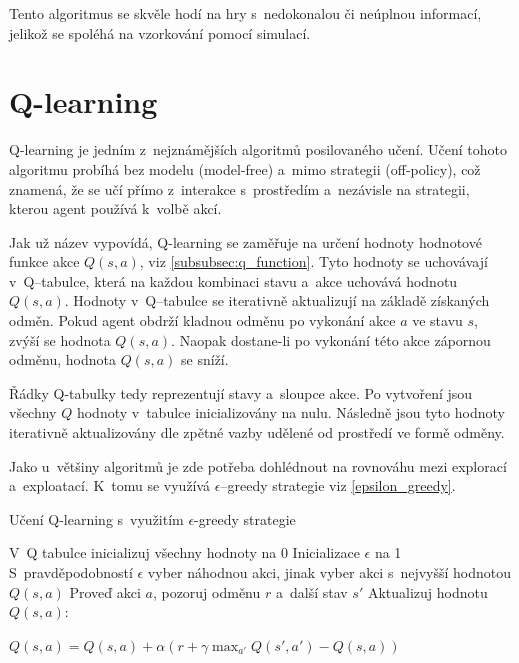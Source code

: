 Tento algoritmus se skvěle hodí na hry s~nedokonalou či neúplnou informací, jelikož se spoléhá na vzorkování pomocí simulací.

\section{Q-learning}\label{subsec:q-learning}

Q-learning je jedním z~nejznámějších algoritmů posilovaného učení.
Učení tohoto algoritmu probíhá bez modelu (model-free) a~mimo strategii (off-policy), což znamená, že se učí přímo z~interakce s~prostředím a~nezávisle na strategii, kterou agent používá k~volbě akcí.

Jak už název vypovídá, Q-learning se zaměřuje na určení hodnoty hodnotové funkce akce $Q(s, a)$, viz \ref{subsubsec:q_function}.
Tyto hodnoty se uchovávají v~Q--tabulce, která na každou kombinaci stavu a~akce uchovává hodnotu $Q(s, a)$.
Hodnoty v~Q--tabulce se iterativně aktualizují na základě získaných odměn.
Pokud agent obdrží kladnou odměnu po vykonání akce $a$ ve stavu $s$, zvýší se hodnota $Q(s, a)$.
Naopak dostane-li po vykonání této akce zápornou odměnu, hodnota $Q(s, a)$ se sníží.

Řádky Q-tabulky tedy reprezentují stavy a~sloupce akce.
Po vytvoření jsou všechny $Q$ hodnoty v~tabulce inicializovány na nulu.
Následně jsou tyto hodnoty iterativně aktualizovány dle zpětné vazby udělené od prostředí ve formě odměny.

Jako u~většiny algoritmů je zde potřeba dohlédnout na rovnováhu mezi explorací a~exploatací.
K~tomu se využívá $\epsilon$--greedy strategie viz \ref{epsilon_greedy}.

\begin{algorithm}[H]
  \caption{Učení Q-learning s~využitím $\epsilon$-greedy strategie}
  \begin{algorithmic}[1]
  \State V~Q tabulce inicializuj všechny hodnoty na 0
  \State Inicializace $\epsilon$ na 1
          \State S~pravděpodobností $\epsilon$ vyber náhodnou akci, jinak vyber akci s~nejvyšší hodnotou $Q(s, a)$
          \State Proveď akci $a$, pozoruj odměnu $r$ a~další stav $s'$
          \State Aktualizuj hodnotu $Q(s, a)$:\par
          $Q(s, a) = Q(s, a) + \alpha \left( r + \gamma \max_{a'} Q(s', a') - Q(s, a) \right)$
    \EndWhile
  \EndFor
  \end{algorithmic}
\end{algorithm}

